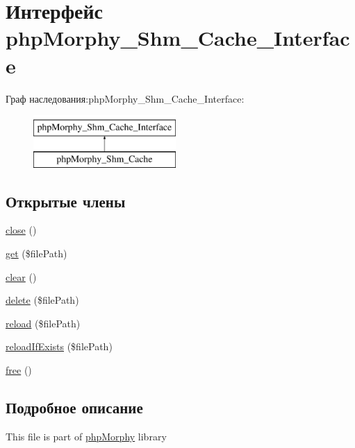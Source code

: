 \hypertarget{interfacephpMorphy__Shm__Cache__Interface}{
\section{Интерфейс phpMorphy\_\-Shm\_\-Cache\_\-Interface}
\label{interfacephpMorphy__Shm__Cache__Interface}
}
Граф наследования:phpMorphy\_\-Shm\_\-Cache\_\-Interface:\begin{figure}[H]
\begin{center}
\leavevmode
\includegraphics[height=2.000000cm]{interfacephpMorphy__Shm__Cache__Interface}
\end{center}
\end{figure}
\subsection*{Открытые члены}
\begin{DoxyCompactItemize}
\item 
\hyperlink{interfacephpMorphy__Shm__Cache__Interface_ab7ee95e37af594a88d9b06494b890bcb}{close} ()
\item 
\hyperlink{interfacephpMorphy__Shm__Cache__Interface_a404d6125f5cc37380ba52291f4f314d8}{get} (\$filePath)
\item 
\hyperlink{interfacephpMorphy__Shm__Cache__Interface_a9339f30efc68175be754c6c1aed3186e}{clear} ()
\item 
\hyperlink{interfacephpMorphy__Shm__Cache__Interface_a09dbf682730ea15a31e2e3ccbbccfaca}{delete} (\$filePath)
\item 
\hyperlink{interfacephpMorphy__Shm__Cache__Interface_ad96bc2ae0da8ba6caf1dfdf23e36ef03}{reload} (\$filePath)
\item 
\hyperlink{interfacephpMorphy__Shm__Cache__Interface_a85cdc3f30929d33fdb4455d24f5243b6}{reloadIfExists} (\$filePath)
\item 
\hyperlink{interfacephpMorphy__Shm__Cache__Interface_a54bde3cb874b17677836e1e212d1b7db}{free} ()
\end{DoxyCompactItemize}


\subsection{Подробное описание}
This file is part of \hyperlink{classphpMorphy}{phpMorphy} library

